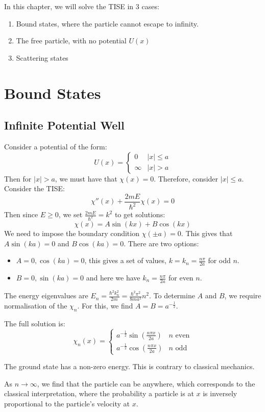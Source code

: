 \documentclass[../Main.tex]{subfiles}
\begin{document}
In this chapter, we will solve the TISE in 3 cases:
\begin{enumerate}
    \item Bound states, where the particle cannot escape to infinity.
    \item The free particle, with no potential $U(x)$
    \item Scattering states
\end{enumerate}
\section{Bound States}
\subsection{Infinite Potential Well}
Consider a potential of the form:
\begin{equation*}
    U(x) =
    \begin{cases}
        0 & |x| \leq a \\
        \infty & |x| > a
    \end{cases}
\end{equation*}
Then for $|x| > a$, we must have that $\chi(x) = 0$. Therefore, consider $|x| \leq a$. Consider the TISE:
\begin{equation*}
    \chi''(x) + \frac{2mE}{\hbar^2} \chi(x) = 0
\end{equation*}
Then since $E \geq 0$, we set $\frac{2mE}{\hbar^2} = k^2$ to get solutions:
\begin{equation*}
    \chi(x) = A\sin(kx) + B\cos(kx)
\end{equation*}
We need to impose the boundary condition $\chi(\pm a) = 0$. This gives that $A\sin(ka) = 0$ and $B\cos(ka) = 0$. There are two options:
\begin{itemize}
    \item $A = 0, \cos(ka) = 0$, this gives a set of values, $k = k_n = \frac{n\pi}{2a}$ for odd $n$.
    \item $B = 0, \sin(ka) = 0$ and here we have $k_n = \frac{n\pi}{2a}$ for even $n$.
\end{itemize}
The energy eigenvalues are $E_n = \frac{\hbar^2 k_n^2}{2m} = \frac{\hbar^2 \pi^2}{8ma^2}n^2$. To determine $A$ and $B$, we require normalisation of the $\chi_n$. For this, we find $A = B = a^{-\frac12}$.

The full solution is:
\begin{equation*}
    \chi_n(x) =
    \begin{cases}
        a^{-\frac12} \sin(\frac{n\pi x}{2a}) & n \text{ even} \\
        a^{-\frac12} \cos(\frac{n\pi x}{2a}) & n \text{ odd}
    \end{cases}
\end{equation*}
\begin{remarks}
    \item The ground state has a non-zero energy. This is contrary to classical mechanics.
    \item As $n \to \infty$, we find that the particle can be anywhere, which corresponds to the classical interpretation, where the probability a particle is at $x$ is inversely proportional to the particle's velocity at $x$.
\end{remarks}
\end{document}
